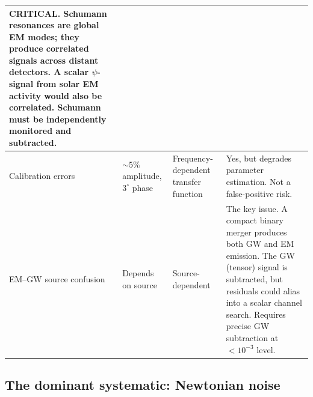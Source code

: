 \documentclass[11pt]{article}
\theoremstyle{definition}
\theoremstyle{remark}
\begin{document}
\begin{longtable}{@{}p{3.5cm}p{2.5cm}p{2cm}p{5cm}@{}}
  \textbf{CRITICAL}. Schumann resonances are global EM modes;
  they produce correlated signals across distant detectors. A scalar
  $\psi$-signal from solar EM activity would also be correlated.
  Schumann must be independently monitored and subtracted.
  \\
\midrule
Calibration errors &
  $\sim 5\%$ amplitude, $3^\circ$ phase &
  Frequency-dependent transfer function &
  Yes, but degrades parameter estimation. Not a false-positive risk.
  \\
\midrule
EM--GW source confusion &
  Depends on source &
  Source-dependent &
  The key issue. A compact binary merger produces both GW and EM
  emission. The GW (tensor) signal is subtracted, but residuals could
  alias into a scalar channel search. Requires precise GW subtraction
  at $<10^{-3}$ level.
  \\
\bottomrule
\end{longtable}

\subsection{The dominant systematic: Newtonian noise}
\end{document}
